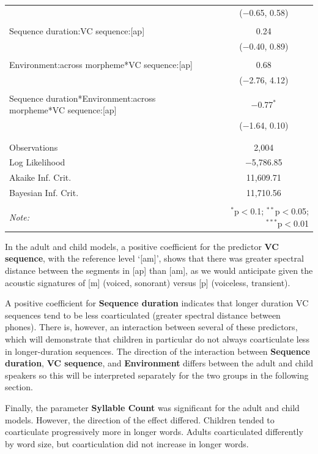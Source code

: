 \documentclass[
]{article}
\begin{document}
\begin{table}[!htbp]
\begin{tabular}{@{\extracolsep{5pt}}lc}
  & ($-$0.65, 0.58) \\ 
  & \\ 
 Sequence duration:VC sequence:[ap] & 0.24 \\ 
  & ($-$0.40, 0.89) \\ 
  & \\ 
 Environment:across morpheme*VC sequence:[ap] & 0.68 \\ 
  & ($-$2.76, 4.12) \\ 
  & \\ 
 Sequence duration*Environment:across morpheme*VC sequence:[ap] & $-$0.77$^{*}$ \\ 
  & ($-$1.64, 0.10) \\ 
  & \\ 
\hline \\[-1.8ex] 
Observations & 2,004 \\ 
Log Likelihood & $-$5,786.85 \\ 
Akaike Inf. Crit. & 11,609.71 \\ 
Bayesian Inf. Crit. & 11,710.56 \\ 
\hline 
\hline \\[-1.8ex] 
\textit{Note:}  & \multicolumn{1}{r}{$^{*}$p$<$0.1; $^{**}$p$<$0.05; $^{***}$p$<$0.01} \\ 
\end{tabular} 
\end{table}

In the adult and child models, a positive coefficient for the predictor \textbf{VC sequence}, with the reference level `{[}am{]}', shows that there was greater spectral distance between the segments in {[}ap{]} than {[}am{]}, as we would anticipate given the acoustic signatures of {[}m{]} (voiced, sonorant) versus {[}p{]} (voiceless, transient).

A positive coefficient for \textbf{Sequence duration} indicates that longer duration VC sequences tend to be less coarticulated (greater spectral distance between phones). There is, however, an interaction between several of these predictors, which will demonstrate that children in particular do not always coarticulate less in longer-duration sequences. The direction of the interaction between \textbf{Sequence duration}, \textbf{VC sequence}, and \textbf{Environment} differs between the adult and child speakers so this will be interpreted separately for the two groups in the following section.

Finally, the parameter \textbf{Syllable Count} was significant for the adult and child models. However, the direction of the effect differed. Children tended to coarticulate progressively more in longer words. Adults coarticulated differently by word size, but coarticulation did not increase in longer words.
\end{document}
